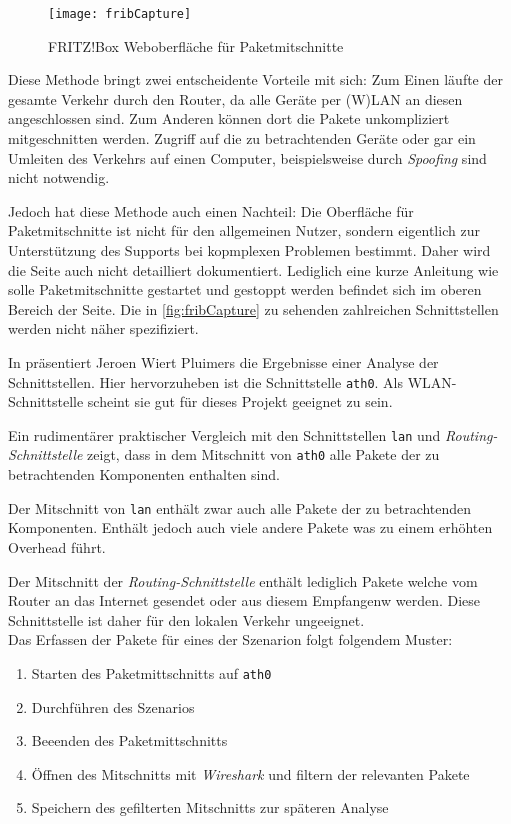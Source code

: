 \begin{figure}[ht!]
    \centering
    \texttt{[image: fribCapture]}
    \caption{FRITZ!Box Weboberfläche für Paketmitschnitte}\label{fig:fribCapture}
\end{figure}

Diese Methode bringt zwei entscheidente Vorteile mit sich:
Zum Einen läufte der gesamte Verkehr durch den Router, da alle Geräte per (W)LAN an diesen angeschlossen sind.
Zum Anderen können dort die Pakete unkompliziert mitgeschnitten werden. Zugriff auf die zu betrachtenden Geräte
oder gar ein Umleiten des Verkehrs auf einen Computer, beispielsweise durch \textit{Spoofing}\cite{Maninthe12:online} sind nicht notwendig.

Jedoch hat diese Methode auch einen Nachteil:
Die Oberfläche für Paketmitschnitte ist nicht für den allgemeinen Nutzer,
sondern eigentlich zur Unterstützung des Supports bei kopmplexen Problemen bestimmt.
Daher wird die Seite auch nicht detailliert dokumentiert.
Lediglich eine kurze Anleitung wie solle Paketmitschnitte gestartet und gestoppt werden befindet sich im oberen Bereich der Seite.
Die in \autoref{fig:fribCapture} zu sehenden zahlreichen Schnittstellen werden nicht näher spezifiziert.

In \cite{fritzcap8:online} präsentiert Jeroen Wiert Pluimers die Ergebnisse einer Analyse der Schnittstellen.
Hier hervorzuheben ist die Schnittstelle \texttt{ath0}. Als WLAN-Schnittstelle scheint sie gut für dieses Projekt geeignet zu sein.

Ein rudimentärer praktischer Vergleich mit den Schnittstellen \texttt{lan} und \textit{Routing-Schnittstelle} zeigt,
dass in dem Mitschnitt von \texttt{ath0} alle Pakete der zu betrachtenden Komponenten enthalten sind.

Der Mitschnitt von \texttt{lan} enthält zwar auch alle Pakete der zu betrachtenden Komponenten.
Enthält jedoch auch viele andere Pakete was zu einem erhöhten Overhead führt.

Der Mitschnitt der \textit{Routing-Schnittstelle} enthält lediglich Pakete welche vom Router an das Internet gesendet oder aus diesem Empfangenw werden.
Diese Schnittstelle ist daher für den lokalen Verkehr ungeeignet.\\

Das Erfassen der Pakete für eines der Szenarion folgt folgendem Muster:
\begin{enumerate}
    \setlength\itemsep{-0.5em}
    \item Starten des Paketmittschnitts auf \texttt{ath0}
    \item Durchführen des Szenarios
    \item Beeenden des Paketmittschnitts
    \item Öffnen des Mitschnitts mit \textit{Wireshark} und filtern der relevanten Pakete
    \item Speichern des gefilterten Mitschnitts zur späteren Analyse
\end{enumerate}